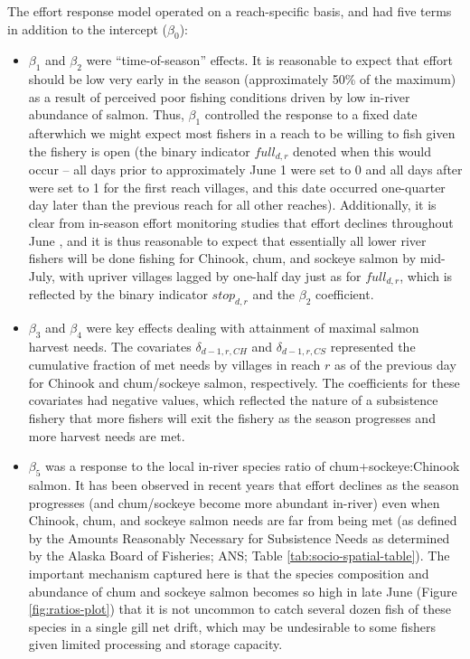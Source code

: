 \documentclass[12pt,]{book}
\theoremstyle{definition}
\theoremstyle{definition}
\theoremstyle{definition}
\theoremstyle{remark}
\begin{document}
\noindent
The effort response model operated on a reach-specific basis, and had
five terms in addition to the intercept (\(\beta_0\)):

\begin{itemize}
\item
  \(\beta_1\) and \(\beta_2\) were ``time-of-season'' effects. It is
  reasonable to expect that effort should be low very early in the
  season (approximately 50\% of the maximum) as a result of perceived
  poor fishing conditions driven by low in-river abundance of salmon.
  Thus, \(\beta_1\) controlled the response to a fixed date afterwhich
  we might expect most fishers in a reach to be willing to fish given
  the fishery is open (the binary indicator \(full_{d,r}\) denoted when
  this would occur -- all days prior to approximately June 1 were set to
  0 and all days after were set to 1 for the first reach villages, and
  this date occurred one-quarter day later than the previous reach for
  all other reaches). Additionally, it is clear from in-season effort
  monitoring studies that effort declines throughout June
  \citep{staton-coggins-2016, staton-coggins-2017, staton-2018}, and it
  is thus reasonable to expect that essentially all lower river fishers
  will be done fishing for Chinook, chum, and sockeye salmon by
  mid-July, with upriver villages lagged by one-half day just as for
  \(full_{d,r}\), which is reflected by the binary indicator
  \(stop_{d,r}\) and the \(\beta_2\) coefficient.
\item
  \(\beta_3\) and \(\beta_4\) were key effects dealing with attainment
  of maximal salmon harvest needs. The covariates \(\delta_{d-1,r,CH}\)
  and \(\delta_{d-1,r,CS}\) represented the cumulative fraction of met
  needs by villages in reach \(r\) as of the previous day for Chinook
  and chum/sockeye salmon, respectively. The coefficients for these
  covariates had negative values, which reflected the nature of a
  subsistence fishery that more fishers will exit the fishery as the
  season progresses and more harvest needs are met.
\item
  \(\beta_5\) was a response to the local in-river species ratio of
  chum+sockeye:Chinook salmon. It has been observed in recent years that
  effort declines as the season progresses (and chum/sockeye become more
  abundant in-river) even when Chinook, chum, and sockeye salmon needs
  are far from being met (as defined by the Amounts Reasonably Necessary
  for Subsistence Needs as determined by the Alaska Board of Fisheries;
  ANS; Table \ref{tab:socio-spatial-table}). The important mechanism
  captured here is that the species composition and abundance of chum
  and sockeye salmon becomes so high in late June (Figure
  \ref{fig:ratios-plot}) that it is not uncommon to catch several dozen
  fish of these species in a single gill net drift, which may be
  undesirable to some fishers given limited processing and storage
  capacity.
\end{itemize}
\end{document}
